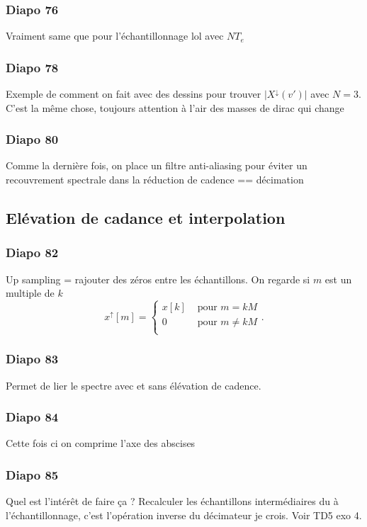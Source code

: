 \documentclass{article}
\theoremstyle{plain}%
\theoremstyle{definition}
\theoremstyle{remark}
\begin{document}
\subsubsection{Diapo 76}
Vraiment same que pour l'échantillonnage lol avec $ N T_e $ 

\subsubsection{Diapo 78}
Exemple de comment on fait avec des dessins pour trouver $ \left| X^{\downarrow }(v') \right|  $ avec $ N = 3 $. C'est la même chose, toujours attention à l'air des masses de dirac qui change

\subsubsection{Diapo 80}
Comme la dernière fois, on place un filtre anti-aliasing pour éviter un recouvrement spectrale dans la réduction de cadence == décimation

\subsection{Elévation de cadance et interpolation}
\subsubsection{Diapo 82}
Up sampling = rajouter des zéros entre les échantillons. On regarde si $ m $ est un multiple de $ k $ 
\[
    x^{\uparrow } [m] = \begin{cases}
    x[k] &\text{ pour } m = kM\\
    0 &\text{ pour } m \neq kM\\
    \end{cases} 
.\]
\subsubsection{Diapo 83}
Permet de lier le spectre avec et sans élévation de cadence.

\subsubsection{Diapo 84}
Cette fois ci on comprime l'axe des abscises

\subsubsection{Diapo 85}
Quel est l'intérêt de faire ça ? Recalculer les échantillons intermédiaires du à l'échantillonnage, c'est l'opération inverse du décimateur je crois. Voir TD5 exo 4. \\
\end{document}
